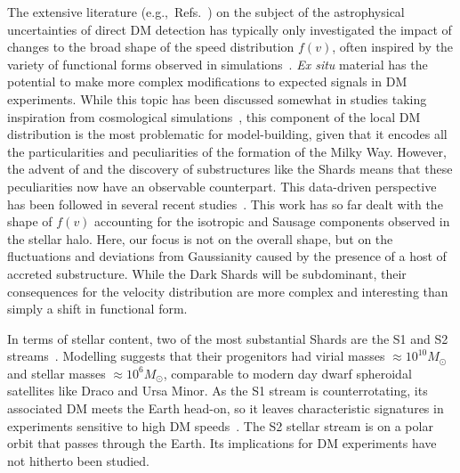 \documentclass[prd,10pt,twocolumn,showpacs,nofootinbib,aps,superscriptaddress,preprintnumbers]{revtex4-1}
\newcommand{\Gaia}{\!{\it Gaia}\xspace}
\begin{document}

 The extensive
 literature (e.g.,~Refs.~\cite{Peter:2009ak,McCabe:2010zh,Fox:2010bz,Fox:2010bu,Fox:2010bu,Peter:2011eu,McCabe:2011sr,Frandsen:2011gi,Gondolo:2012rs,Kavanagh:2013wba,Kavanagh:2013eya,DelNobile:2013cta,Fox:2014kua,Feldstein:2014gza,Gelmini:2016pei,Gondolo:2017jro,Gelmini:2017aqe,Ibarra:2017mzt,Fowlie:2017ufs,Ibarra:2018yxq,Herrero-Garcia:2019ntx,Amole:2019coq,Buch:2019aiw,Besla:2019xbx})
 on the subject of the astrophysical uncertainties of direct DM
 detection has typically only investigated the impact of changes to the
 broad shape of the speed distribution $f(v)$, often inspired by the
 variety of functional forms observed in simulations~\cite{Lisanti:2010qx,Mao:2013nda,Mao:2012hf,Butsky:2015pya}. {\it Ex situ}
 material has the potential to make more complex modifications to expected
 signals in DM experiments. While this topic has been discussed somewhat in studies
 taking inspiration from cosmological simulations~\cite{Kuhlen:2009vh,Kuhlen:2012fz}, this
 component of the local DM distribution is the most problematic for
 model-building, given that it encodes all the particularities and
 peculiarities of the formation of the Milky Way. However, the advent of
 \Gaia and the discovery of substructures like the Shards means that
 these peculiarities now have an observable counterpart. This
 data-driven perspective has been followed in several recent studies~\cite{Herzog-Arbeitman:2017fte,Herzog-Arbeitman:2017zbm,Necib_2019,Necib:2018igl,Evans:2018bqy,Ostdiek:2019gnb,Necib:2019zbk,Necib:2019zka,Bozorgnia:2019mjk}.
This work has so far dealt with the shape of $f(v)$ accounting
 for the isotropic and Sausage components observed in the \Gaia stellar
 halo.  Here, our focus is not on the overall shape, but on the
 fluctuations and deviations from Gaussianity caused by the presence of
 a host of accreted substructure. While the Dark Shards will be subdominant,
  their consequences for the velocity distribution
 are more complex and interesting than simply a shift in functional form.

 In terms of stellar content, two of the most substantial Shards are
 the S1 and S2 streams~\cite{Myeong:Preprint,Myeong:2017,Yu19}. Modelling
 suggests that their progenitors had virial masses $\approx 10^{10}
 M_\odot$ and stellar masses $\approx 10^6 M_\odot$, comparable to
 modern day dwarf spheroidal satellites like Draco and Ursa Minor.  As
 the S1 stream is counterrotating, its associated DM meets the Earth
 head-on, so it leaves characteristic signatures in experiments sensitive to high DM speeds~\cite{OHare:2018trr}. The S2 stellar
 stream is on a polar orbit that passes through the Earth. Its
 implications for DM experiments have not hitherto been studied. 
 
\end{document}
